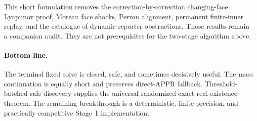 This short formulation removes the correction-by-correction changing-face
Lyapunov proof, Moreau face shocks, Perron alignment, permanent finite-inner
replay, and the catalogue of dynamic-reporter obstructions.  Those results
remain a companion audit.  They are not prerequisites for the two-stage
algorithm above.

\paragraph{Bottom line.}
The terminal fixed solve is closed, safe, and sometimes decisively useful.
The mass continuation is equally short and preserves direct-APPR fallback.
Threshold-batched safe discovery supplies the universal randomized exact-real
existence theorem.  The remaining breakthrough is a deterministic,
finite-precision, and practically competitive Stage~I implementation.
